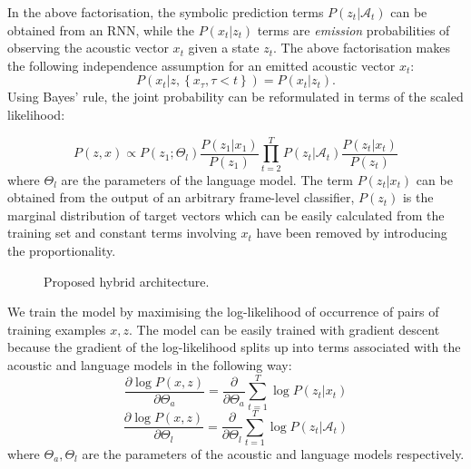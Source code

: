 \documentclass{article}
\begin{document}
In the above factorisation, the symbolic prediction terms $P(z_t|\mathcal{A}_t)$ can be obtained from an RNN, while the $P(x_t|z_t)$ terms are \emph{emission} probabilities of observing the acoustic vector $x_t$ given a state $z_t$. The above factorisation makes the following independence assumption for an emitted acoustic vector $x_t$:
\begin{equation}
\label{independence}
P(x_t | z, \left\{ x_{\tau} , \tau < t \right\}) = P(x_t | z_t). 
\end{equation}
Using Bayes' rule, the joint probability can be reformulated in terms of the scaled likelihood:

\begin{equation}
P(z,x) \propto P(z_1;\Theta_l) \frac{P(z_1|x_{1})}{P(z_1)} \prod_{t=2}^{T} P(z_t|\mathcal{A}_t) \frac{P(z_t|x_t)}{P(z_t)}
\end{equation} where $\Theta_l$ are the parameters of the language model. 
The term $P(z_t|x_t)$ can be obtained from the output of an arbitrary frame-level classifier, $P(z_t)$ is the marginal distribution of target vectors which can be easily calculated from the training set and constant terms involving $x_t$ have been removed by introducing the proportionality. 

\begin{figure}[]
\begin{minipage}[b]{1.0\linewidth}
  \centering
  \resizebox{240pt}{!}{}
\end{minipage}
\label{fig:res}
\caption{Proposed hybrid architecture.}
\end{figure}

We train the model by maximising the log-likelihood of occurrence of pairs of training examples $x,z$. The model can be easily trained with gradient descent because the gradient of the log-likelihood splits up into terms associated with the acoustic and language models in the following way:
\begin{equation}
\label{train_1}
\frac{\partial \log P(x,z)}{\partial \Theta_a} = \frac{\partial}{\partial \Theta_a} \sum_{t=1}^T \log P(z_t|x_t)
\end{equation}
\begin{equation}
\label{train_2}
\frac{\partial \log P(x,z)}{\partial \Theta_l} = \frac{\partial}{\partial \Theta_l} \sum_{t=1}^T \log P(z_t|\mathcal A_t)
\end{equation}
where $\Theta_a,\Theta_l$ are the parameters of the acoustic and language models respectively. 
\end{document}
